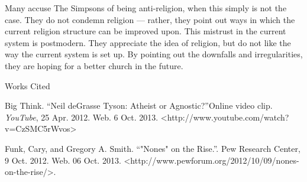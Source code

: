 \documentclass[12pt]{article}
\newcommand{\bibent}{\noindent \hangindent 40pt}
\newenvironment{workscited}{\newpage \begin{center} Works Cited \end{center}}{\newpage }
\begin{document}
\begin{flushleft}
Many accuse The Simpsons of being anti-religion, when this simply is not the case. They do not condemn religion --- rather, they point out ways in which the current religion structure can be improved upon. This mistrust in the current system is postmodern. They appreciate the idea of religion, but do not like the way the current system is set up. By pointing out the downfalls and irregularities, they are hoping for a better church in the future.



\begin{workscited}

\bibent
Big Think. \textquotedblleft Neil deGrasse Tyson: Atheist or Agnostic?\textquotedblright Online video clip. \textit{YouTube}, 25 Apr. 2012. Web. 6 Oct. 2013. <http://www.youtube.com/watch?v=CzSMC5rWvos>

\bibent
Funk, Cary, and Gregory A. Smith. \textquotedblleft "Nones" on the Rise.\textquotedblright  {}. Pew Research Center, 9 Oct. 2012. Web. 06 Oct. 2013. <http://www.pewforum.org/2012/10/09/nones-on-the-rise/>.

\end{workscited}
\end{flushleft}
\end{document}
